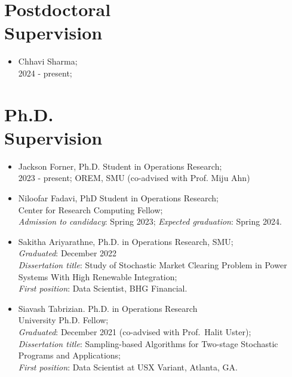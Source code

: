 \documentclass[hyperref, margin]{myResume}
\begin{document}
\begin{resume}
\section{Postdoctoral \\Supervision}
	\begin{itemize}[leftmargin=*]
		\item Chhavi Sharma;\\
		2024 - present;
	\end{itemize}

\section{Ph.D. \\Supervision}
	\begin{itemize}[leftmargin=*]
		\item Jackson Forner, Ph.D. Student in Operations Research;\\
		2023 - present; OREM, SMU (co-advised with Prof. Miju Ahn)

		\item Niloofar Fadavi, PhD Student in Operations Research; \\
		Center for Research Computing Fellow; \\
		\emph{Admission to candidacy}: Spring 2023;
		\emph{Expected graduation}: Spring 2024.
		
		\item Sakitha Ariyarathne, Ph.D. in Operations Research, SMU;\\
		\emph{Graduated}: December 2022\\
		\emph{Dissertation title}: Study of Stochastic Market Clearing Problem in Power Systems With High Renewable Integration;\\
		\emph{First position}: Data Scientist, BHG Financial.

		\item Siavash Tabrizian. Ph.D. in Operations Research \\
		University Ph.D. Fellow;\\
		\emph{Graduated}: December 2021 (co-advised with Prof.\ Halit Uster);\\
		\emph{Dissertation title}: Sampling-based Algorithms for Two-stage Stochastic Programs and Applications;\\
		\emph{First position}: Data Scientist at USX Variant, Atlanta, GA.
	\end{itemize}

	\vspace{-0.2cm}

\end{resume}
\end{document}
